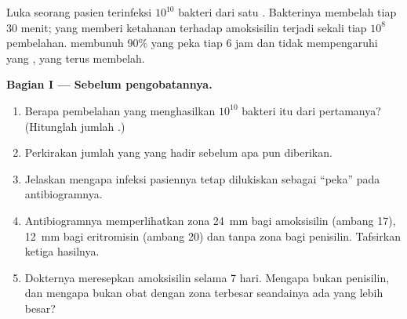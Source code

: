 \begin{problem}
\label{pb:g11:antibiotic-resistance:1}
Luka seorang pasien terinfeksi $10^{10}$ bakteri dari satu .
Bakterinya membelah tiap 30 menit;  yang memberi ketahanan
terhadap  amoksisilin terjadi sekali tiap $10^8$ pembelahan.
 membunuh 90\%  yang peka tiap 6 jam dan tidak
mempengaruhi  yang , yang terus membelah.

\medskip
\noindent\textbf{Bagian I --- Sebelum pengobatannya.}
\begin{enumerate}
  \item Berapa pembelahan yang menghasilkan $10^{10}$ bakteri itu dari
         pertamanya? (Hitunglah jumlah .)
  \item Perkirakan jumlah  yang  yang hadir sebelum 
        apa pun diberikan.
  \item Jelaskan mengapa infeksi pasiennya tetap dilukiskan sebagai
        ``peka'' pada antibiogramnya.
  \item Antibiogramnya memperlihatkan zona \qty{24}{mm} bagi
        amoksisilin (ambang 17), \qty{12}{mm} bagi eritromisin (ambang
        20) dan tanpa zona bagi penisilin. Tafsirkan ketiga hasilnya.
  \item Dokternya meresepkan amoksisilin selama 7 hari. Mengapa bukan
        penisilin, dan mengapa bukan obat dengan zona terbesar
        seandainya ada yang lebih besar?
\end{enumerate}


\end{problem}
